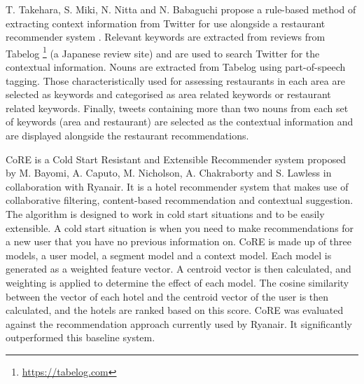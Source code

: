 T. Takehara, S. Miki, N. Nitta and N. Babaguchi propose a rule-based method of extracting context information from Twitter for use alongside a restaurant recommender system \cite{takeharaContext2012}. Relevant keywords are extracted from reviews from Tabelog \footnote{\url{https://tabelog.com}} (a Japanese review site) and are used to search Twitter for the contextual information. Nouns are extracted from Tabelog using part-of-speech tagging. Those characteristically used for assessing restaurants in each area are selected as keywords and categorised as area related keywords or restaurant related keywords. Finally, tweets containing more than two nouns from each set of keywords (area and restaurant) are selected as the contextual information and are displayed alongside the restaurant recommendations.

CoRE \cite{core2019} is a Cold Start Resistant and Extensible Recommender system proposed by M. Bayomi, A. Caputo, M. Nicholson, A. Chakraborty and S. Lawless in collaboration with Ryanair. It is a hotel recommender system that makes use of collaborative filtering, content-based recommendation and contextual suggestion. The algorithm is designed to work in cold start situations and to be easily extensible. A cold start situation is when you need to make recommendations for a new user that you have no previous information on. CoRE is made up of three models, a user model, a segment model and a context model. Each model is generated as a weighted feature vector. A centroid vector is then calculated, and weighting is applied to determine the effect of each model. The cosine similarity between the vector of each hotel and the centroid vector of the user is then calculated, and the hotels are ranked based on this score. CoRE was evaluated against the recommendation approach currently used by Ryanair. It significantly outperformed this baseline system.


